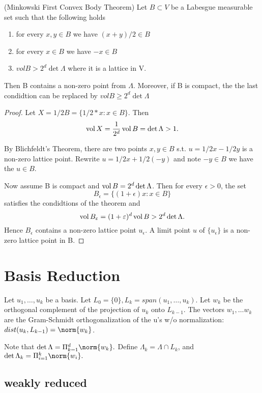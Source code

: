 \begin{theorem}(Minkowski First Convex Body Theorem)
Let $B \subset V$ be a Labesgue measurable set such that the following holds
\begin{enumerate}
	\item for every $x, y \in B$ we have $(x+y)/2 \in B$
	\item for every $x \in B$ we have $-x \in B$
	\item $vol B > 2^d \det \Lambda$ where it is a lattice in V.
\end{enumerate}
Then B contains a non-zero point from $\Lambda$. Moreover, if B is compact, the the last condidtion can be replaced by $vol B \geq 2^d \det \Lambda$ 
\end{theorem}
\begin{proof}
Let $X = 1/2 B = \{ 1/2 * x : x \in B \}$. Then \[ \operatorname{vol} X = \frac{1}{2^d} \operatorname{vol} B = \det \Lambda > 1.  \]

By Blichfeldt's Theorem, there are two points $x, y \in B$ s.t. $u = 1/2 x - 1/2 y$ is a non-zero lattice point. Rewrite $u = 1/2 x + 1/2 (-y)$ and note $-y \in B$ we have the $u \in B$.

Now assume B is compact and $\operatorname{vol} B = 2^d \det \Lambda$. Then for every $\epsilon > 0$, the set 
\[ B_\epsilon =\{ (1+\epsilon)x : x \in B\} \] satisfies the condidtions of the theorem and \[\operatorname{vol} B_\varepsilon = (1+\varepsilon)^d \operatorname{vol} B > 2^d \det \Lambda. \] Hence $B_\epsilon$ contains a non-zero lattice point $u_\epsilon$. A limit point $u$ of $\{u_\epsilon\}$ is a non-zero lattice point in B.
\end{proof}



\section{Basis Reduction}

Let $u_1, \dots, u_k$ be a basis. Let $L_0 = \{0\}, L_k = span(u_1, \dots, u_k)$. Let $w_k$ be the orthogonal complement of the projection of $u_k$ onto $L_{k-1}$. The vectors $w_1, \dots w_k$ are the Gram-Schmidt orthogonalization of the u's w/o normalization: $dist(u_k, L_{k-1}) = \norm{w_k}$.

Note that $\det \Lambda = \Pi_{k=1}^d \norm{w_k}.$  Define $\Lambda_k = \Lambda \cap L_k$, and $\det \Lambda_k = \Pi_{i=1}^k \norm{w_i}.$


\subsection{weakly reduced}

